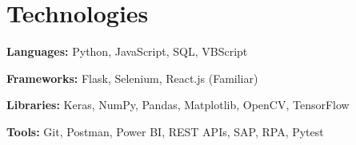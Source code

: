\section{Technologies}
\begin{onecolentry}
\textbf{Languages:} Python, JavaScript, SQL, VBScript
\end{onecolentry}
\vspace{0.05 cm}
\begin{onecolentry}
\textbf{Frameworks:} Flask, Selenium, React.js (Familiar)
\end{onecolentry}
\vspace{0.05 cm}
\begin{onecolentry}
\textbf{Libraries:} Keras, NumPy, Pandas, \newline Matplotlib,  OpenCV,  TensorFlow
\end{onecolentry}
\vspace{0.05 cm}
\begin{onecolentry}
\textbf{Tools:} Git, Postman, Power BI, \newline  REST APIs,  SAP, RPA, Pytest
\end{onecolentry}


